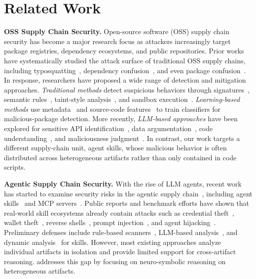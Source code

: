 \section{Related Work}
\label{sec:related_work}

\noindent \textbf{OSS Supply Chain Security.}
Open-source software (OSS) supply chain security has become a major research focus as attackers increasingly target package registries, dependency ecosystems, and public repositories. Prior works~\cite{gu2023package,ladisa2023sokattack} have systematically studied the attack surface of traditional OSS supply chains, including typosquatting~\cite{ladisa2023sokattack,xie2025squatting}, dependency confusion~\cite{ladisa2023sokattack}, and even package confusion~\cite{neupane2023typosquatting}. In response, researchers have proposed a wide range of detection and mitigation approaches. \emph{Traditional methods} detect suspicious behaviors through signatures~\cite{zheng2024oscar}, semantic rules~\cite{li2023malwukong}, taint-style analysis~\cite{li2023malwukong,duan2021maloss}, and sandbox execution~\cite{zheng2024oscar,duan2021maloss}. \emph{Learning-based methods} use metadata~\cite{sajal2024metadata} and source-code features~\cite{sejfia2022practical,ladisa2023feasibility} to train classifiers for malicious-package detection. More recently, \emph{LLM-based approaches} have been explored for sensitive API identification~\cite{huang2024spiderscan}, data argumentation~\cite{gao2024malguard}, code understanding~\cite{wang2025malpacdetector,yu2024maltracker}, and maliciousness judgment~\cite{zahan2025socketai,di2024posterllm}. In contrast, our work targets a different supply-chain unit, agent skills, whose malicious behavior is often distributed across heterogeneous artifacts rather than only contained in code scripts.

\noindent \textbf{Agentic Supply Chain Security.}
With the rise of LLM agents, recent work has started to examine security risks in the agentic supply chain~\cite{hu2025llmsc,wang2025llmsc,huang2025llmsc}, including agent skills~\cite{liu2026maliciousagentskillswild,liu2026vulskill,guo2026skillprobesecurityauditingemerging} and MCP servers~\cite{hou2026mcp,wang2025mcpguardautomaticallydetecting}. Public reports and benchmark efforts have shown that real-world skill ecosystems already contain attacks such as credential theft~\cite{koi2026clawhavoc}, wallet theft~\cite{koi2026clawhavoc,opensourcemalware-clawdbot-crypto}, reverse shells~\cite{snyk2026skills}, prompt injection~\cite{snyk2026skills}, and agent hijacking~\cite{liu2026maliciousagentskillswild}. Preliminary defenses include rule-based scanners~\cite{huifer-skill-security-scan,goplus-agentguard}, LLM-based analysis~\cite{cisco-skill-scanner}, and dynamic analysis~\cite{liu2026maliciousagentskillswild} for skills. However, most existing approaches analyze individual artifacts in isolation and provide limited support for cross-artifact reasoning. \toolname addresses this gap by focusing on neuro-symbolic reasoning on heterogeneous artifacts.